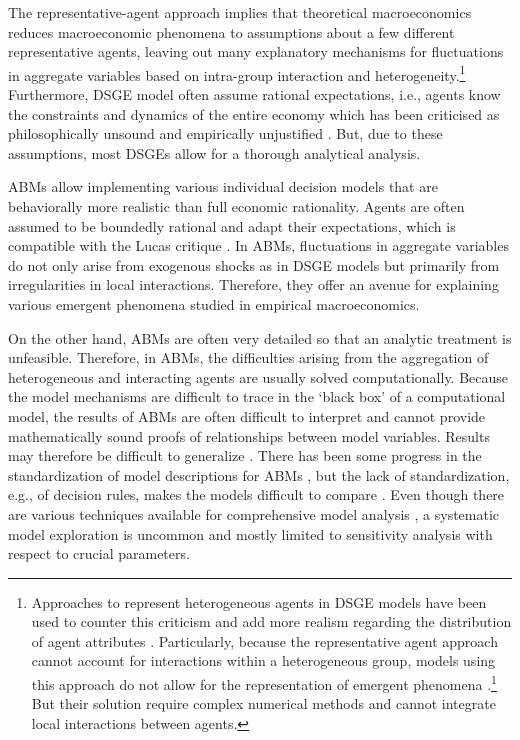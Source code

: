 The representative-agent approach implies that theoretical macroeconomics reduces macroeconomic phenomena to assumptions about a few different representative agents, leaving out many explanatory mechanisms for fluctuations in aggregate variables based on intra-group interaction and heterogeneity.\footnote{Approaches to represent heterogeneous agents in DSGE models have been used to counter this criticism and add more realism regarding the distribution of agent attributes \citep[see for example the review by][]{Heathcote2009}.
Particularly, because the representative agent approach cannot account for interactions within a heterogeneous group, models using this approach do not allow for the representation of emergent phenomena \citet{Kirman1992}.\footnote{I use here a weak notion of emergence, which allows explaining macro-phenomena on the basis of micro-interactions of the systems constituents that differ from the explained macro-phenomena. This is opposed to strong emergence, that embraces the irreducibility of macro-phenomena to lower-level dynamics. For a discussion see \citet{Bedau1997}.}
But their solution require complex numerical methods and cannot integrate local interactions between agents.}
Furthermore, DSGE model often assume rational expectations, i.e., agents know the constraints and dynamics of the entire economy which has been criticised as philosophically unsound and empirically unjustified \citep{Kirman2014}.
But, due to these assumptions, most DSGEs allow for a thorough analytical analysis.

ABMs allow implementing various individual decision models that are behaviorally more realistic than full economic rationality.
Agents are often assumed to be boundedly rational and adapt their expectations, which is compatible with the Lucas critique \citep{Evans2006}.
In ABMs, fluctuations in aggregate variables do not only arise from exogenous shocks as in DSGE models but primarily from irregularities in local interactions.
Therefore, they offer an avenue for explaining various emergent phenomena studied in empirical macroeconomics.

On the other hand, ABMs are often very detailed so that an analytic treatment is unfeasible. 
Therefore, in ABMs, the difficulties arising from the aggregation of heterogeneous and interacting agents are usually solved computationally.
Because the model mechanisms are difficult to trace in the `black box' of a computational model, the results of ABMs are often difficult to interpret and cannot provide mathematically sound proofs of relationships between model variables. Results may therefore be difficult to generalize \citep{Leombruni2005}.
There has been some progress in the standardization of model descriptions for ABMs \citep{Grimm2006}, but the lack of standardization, e.g., of decision rules, makes the models difficult to compare \citep[][p. 239]{Hamill2015}. Even though there are various techniques available for comprehensive model analysis \citep{Lee2015}, a systematic model exploration is uncommon and mostly limited to sensitivity analysis with respect to crucial parameters.

